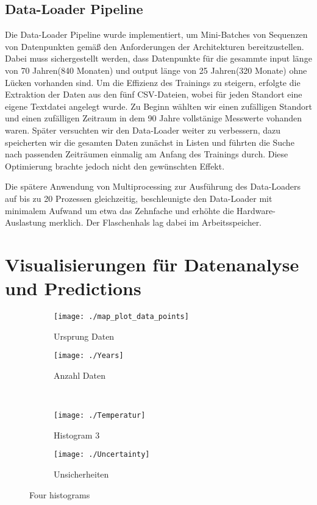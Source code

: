 \documentclass[manuscript,screen,review]{acmart}
\begin{document}
\subsection{Data-Loader Pipeline} %
Die Data-Loader Pipeline wurde implementiert, um Mini-Batches von Sequenzen von Datenpunkten gemäß den Anforderungen der Architekturen bereitzustellen. Dabei muss sichergestellt werden, dass Datenpunkte für die gesammte input länge von 70 Jahren(840 Monaten) und output länge von 25 Jahren(320 Monate) ohne Lücken vorhanden sind.
Um die Effizienz des Trainings zu steigern, erfolgte die Extraktion der Daten aus den fünf CSV-Dateien, wobei für jeden Standort eine eigene Textdatei angelegt wurde. Zu Beginn wählten wir einen zufälligen Standort und einen zufälligen Zeitraum in dem 90 Jahre vollstänige Messwerte vohanden waren.
Später versuchten wir den Data-Loader weiter zu verbessern, dazu speicherten wir die gesamten Daten zunächst in Listen und führten die Suche nach passenden Zeiträumen einmalig am Anfang des Trainings durch. Diese Optimierung brachte jedoch nicht den gewünschten Effekt.

Die spätere Anwendung von Multiprocessing zur Ausführung des Data-Loaders auf bis zu 20 Prozessen gleichzeitig, beschleunigte den Data-Loader mit minimalem Aufwand um etwa das Zehnfache und erhöhte die Hardware-Auslastung merklich. Der Flaschenhals lag dabei im Arbeitsspeicher.


\section{Visualisierungen für Datenanalyse und Predictions}

\begin{figure}[htp]
  \centering
  \begin{subfigure}{.45\textwidth}
      \centering
      \texttt{[image: ./map\_plot\_data\_points]}
      \caption{Ursprung Daten}
      \label{fig:sub1}
  \end{subfigure}%
  \begin{subfigure}{.45\textwidth}
      \centering
      \texttt{[image: ./Years]}
      \caption{Anzahl Daten}
      \label{fig:sub2}
  \end{subfigure}\\
  \begin{subfigure}{.45\textwidth}
      \centering
      \texttt{[image: ./Temperatur]}
      \caption{Histogram 3}
      \label{fig:sub3}
  \end{subfigure}%
  \begin{subfigure}{.45\textwidth}
      \centering
      \texttt{[image: ./Uncertainty]}
      \caption{Unsicherheiten}
      \label{fig:sub4}
  \end{subfigure}
  \caption{Four histograms}
  \label{fig:test}
\end{figure}
\end{document}

